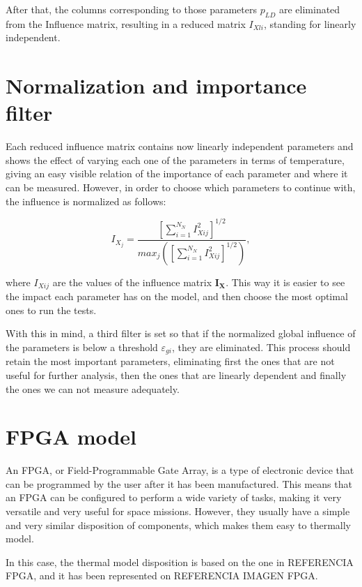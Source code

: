 After that, the columns corresponding to those parameters $p_{LD}$ are eliminated from the Influence matrix, resulting in a reduced matrix $I_{Xli}$, standing for linearly independent.

\section{Normalization and importance filter}\label{s:infmat}
Each reduced influence matrix contains now linearly independent parameters and shows the effect of varying each one of the parameters in terms of temperature, giving an easy visible relation of the importance of each parameter and where it can be measured. However, in order to choose which parameters to continue with, the influence is normalized as follows:


\begin{equation}I_{X_j}=\frac{\left[\sum_{i=1}^{N_N}I_{Xij}^2\right]^{1/2}}{max_j\left(\left[\sum_{i=1}^{N_N}I_{Xij}^2\right]^{1/2}\right)},\end{equation}

where $I_{Xij}$ are the values of the influence matrix $\boldsymbol{I_X}$. This way it is easier to see the impact each parameter has on the model, and then choose the most optimal ones to run the tests.

With this in mind, a third filter is set so that if the normalized global influence of the parameters is below a threshold $\varepsilon_{gi}$, they are eliminated.
This process should retain the most important parameters, eliminating first the ones that are not useful for further analysis, then the ones that are linearly dependent and finally the ones we can not measure adequately.


\section{FPGA model}

An FPGA, or Field-Programmable Gate Array, is a type of electronic device that can be programmed by the user after it has been manufactured. This means that an FPGA can be configured to perform a wide variety of tasks, making it very versatile and very useful for space missions. However, they usually have a simple and very similar disposition of components, which makes them easy to thermally model.

In this case, the thermal model disposition is based on the one in REFERENCIA FPGA, and it has been represented on REFERENCIA IMAGEN FPGA. 


